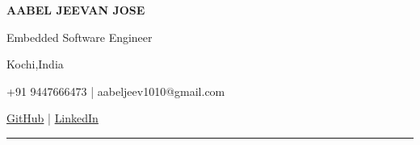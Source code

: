 \documentclass[10pt,a4paper]{article}
\begin{document}

\begin{center}

{\Huge\bfseries AABEL JEEVAN JOSE}

\vspace{4pt}

{\large Embedded Software Engineer}

\vspace{6pt}

Kochi,India

\vspace{3pt}

+91 9447666473 \hspace{15pt} | \hspace{15pt}
aabeljeev1010@gmail.com

\vspace{3pt}

\href{https://github.com/Aabeljeevan}{GitHub}
\hspace{15pt} | \hspace{15pt}
\href{https://www.linkedin.com/in/aabel-jeevan-jose-47b999202/}{LinkedIn}

\end{center}

\vspace{6pt}

\hrule

\vspace{10pt}







\end{document}
